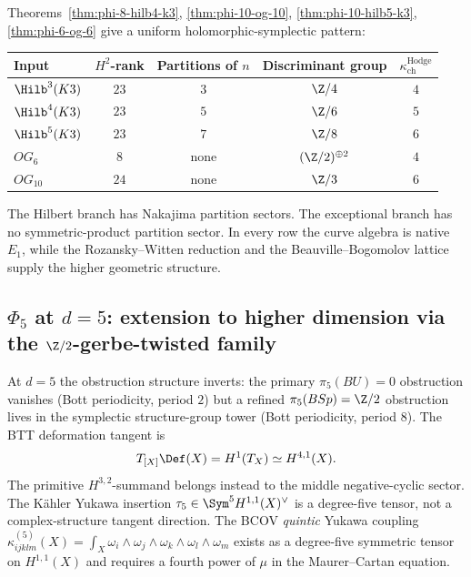 \begin{remark}
\label{rem:phi-2k-pattern-k-3-4-5}
%
Theorems~\ref{thm:phi-8-hilb4-k3}, \ref{thm:phi-10-og-10},
\ref{thm:phi-10-hilb5-k3}, \ref{thm:phi-6-og-6} give a uniform
holomorphic-symplectic pattern:
\begin{center}
\begin{tabular}{lcccc}
\toprule
Input & \(H^2\)-rank & Partitions of \(n\) & Discriminant group &
\(\kappa_{\mathrm{ch}}^{\mathrm{Hodge}}\) \\
\midrule
$\Hilb^3(K3)$ & $23$ & $3$ & $\Z/4$ & $4$ \\
$\Hilb^4(K3)$ & $23$ & $5$ & $\Z/6$ & $5$ \\
$\Hilb^5(K3)$ & $23$ & $7$ & $\Z/8$ & $6$ \\
$OG_6$ & $8$ & none & $(\Z/2)^{\oplus2}$ & $4$ \\
$OG_{10}$ & $24$ & none & $\Z/3$ & $6$ \\
\bottomrule
\end{tabular}
\end{center}
The Hilbert branch has Nakajima partition sectors. The exceptional branch
has no symmetric-product partition sector. In every row the curve algebra is
native \(E_1\), while the Rozansky--Witten reduction and the
Beauville--Bogomolov lattice supply the higher geometric structure.
\end{remark}


\subsection{\texorpdfstring{$\Phi_5$}{Phi-5} at \texorpdfstring{$d=5$}{d=5}: extension to higher dimension via the \texorpdfstring{$\Z/2$}{Z/2}-gerbe-twisted family}
\label{subsec:phi-5-extension-d5}

At $d = 5$ the obstruction structure inverts: the primary $\pi_5(BU) = 0$
obstruction vanishes \textup{(}Bott periodicity, period $2$\textup{)} but a refined
$\pi_5(BSp) = \Z/2$ obstruction lives in the symplectic structure-group tower
\textup{(}Bott periodicity, period $8$\textup{)}. The BTT deformation tangent is
\[
T_{[X]}\Def(X)=H^1(T_X)\simeq H^{4,1}(X).
\]
The primitive \(H^{3,2}\)-summand belongs instead to the middle
negative-cyclic sector. The K\"ahler Yukawa insertion
\(\tau_5\in\Sym^5H^{1,1}(X)^\vee\) is a degree-five tensor, not a
complex-structure tangent direction. The BCOV \emph{quintic} Yukawa coupling
$\kappa_{ijklm}^{(5)}(X) = \int_X \omega_i \wedge \omega_j \wedge \omega_k \wedge
\omega_l \wedge \omega_m$ exists as a degree-five symmetric tensor on $H^{1,1}(X)$ and
requires a fourth power of $\mu$ in the Maurer--Cartan equation.

